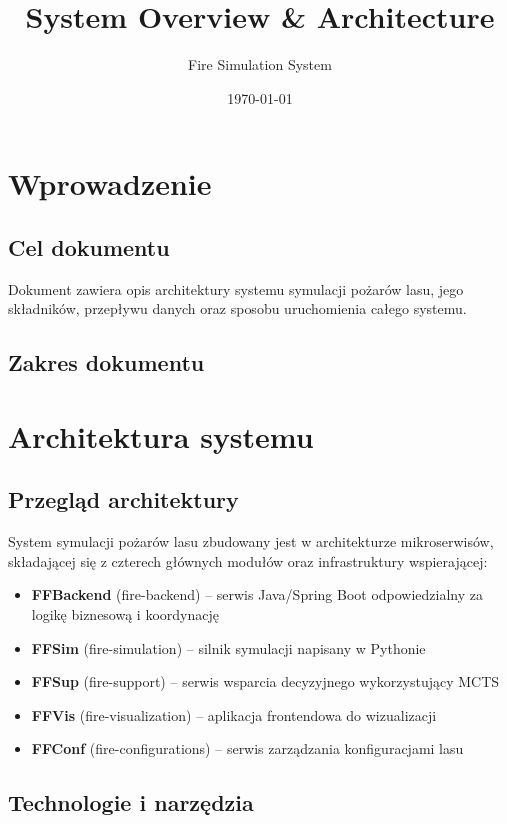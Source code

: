 \documentclass[11pt,a4paper]{article}
\title{System Overview \& Architecture}
\author{Fire Simulation System}
\date{\today}
\begin{document}
\maketitle
\newpage

\section{Wprowadzenie}

\subsection{Cel dokumentu}

Dokument zawiera opis architektury systemu symulacji pożarów lasu, jego składników, przepływu danych oraz sposobu uruchomienia całego systemu.
\subsection{Zakres dokumentu}

\section{Architektura systemu}

\subsection{Przegląd architektury}

System symulacji pożarów lasu zbudowany jest w architekturze mikroserwisów, składającej się z czterech głównych modułów oraz infrastruktury wspierającej:

\begin{itemize}
    \item \textbf{FFBackend} (fire-backend) -- serwis Java/Spring Boot odpowiedzialny za logikę biznesową i koordynację
    \item \textbf{FFSim} (fire-simulation) -- silnik symulacji napisany w Pythonie
    \item \textbf{FFSup} (fire-support) -- serwis wsparcia decyzyjnego wykorzystujący MCTS
    \item \textbf{FFVis} (fire-visualization) -- aplikacja frontendowa do wizualizacji
    \item \textbf{FFConf} (fire-configurations) -- serwis zarządzania konfiguracjami lasu
\end{itemize}


\subsection{Technologie i narzędzia}
\end{document}

